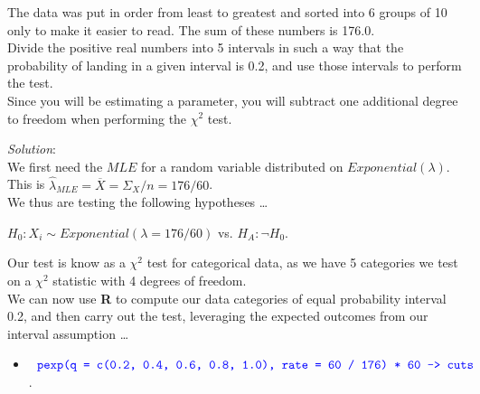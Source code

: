 \documentclass[12pt]{article}
\newcommand{\XB}{\color{black}}
\newcommand{\XBB}{\color{blue}}
\newcommand{\ds}{\displaystyle}
\begin{document}
The data was put in order from least to greatest and sorted into 6 groups of 10
only to make it easier to read. The sum of these numbers is 176.0. \\

Divide the positive real numbers into 5 intervals in such a way that the probability of
landing in a given interval is 0.2, and use those intervals to perform the test. \\

Since you will be estimating a parameter, you will subtract one additional degree to
freedom when performing the $ \chi^{2} $ test. \\

\XBB\hrulefill\XB
\vspace{5mm}

\vspace{2.5mm}
\textit{Solution}:
\vspace{2.5mm} \\

\noindent
We first need the $ MLE $ for a random variable distributed on $ Exponential(\lambda) $. \\

This is $ \hat{\lambda}_{MLE} = \overline{X} = \Sigma_{X} / n = 176 / 60 $. \\

\noindent
We thus are testing the following hypotheses \dots \\

\begin{center}
    $ H_{0} : X_{i} \sim Exponential(\lambda = 176 / 60) $ vs. $ H_{A} : \lnot H_{0} $. \\
\end{center}

\noindent
Our test is know as a $ \chi^{2} $ test for categorical data,
as we have 5 categories we test on a $ \chi^{2} $ statistic with 4 degrees of freedom. \\

We can now use \textbf{R} to compute our data categories of equal probability interval 0.2,
and then carry out the test, leveraging the expected outcomes from our interval assumption \dots \\

\begin{itemize}
    \item $ \ds {\XBB \texttt{ pexp(q = c(0.2, 0.4, 0.6, 0.8, 1.0), rate = 60 / 176) * 60 -> cuts }} $.
\end{itemize}
\end{document}
